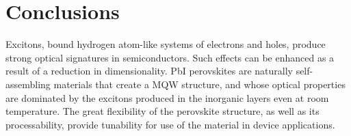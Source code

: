 \section{Conclusions}
Excitons, bound hydrogen atom-like systems of electrons and holes, produce strong optical signatures in semiconductors. Such effects can be enhanced as a result of a reduction in dimensionality. PbI perovskites are naturally self-assembling materials that create a MQW structure, and whose optical properties are dominated by the excitons produced in the inorganic layers even at room temperature. The great flexibility of the perovskite structure, as well as its processability, provide tunability for use of the material in device applications.